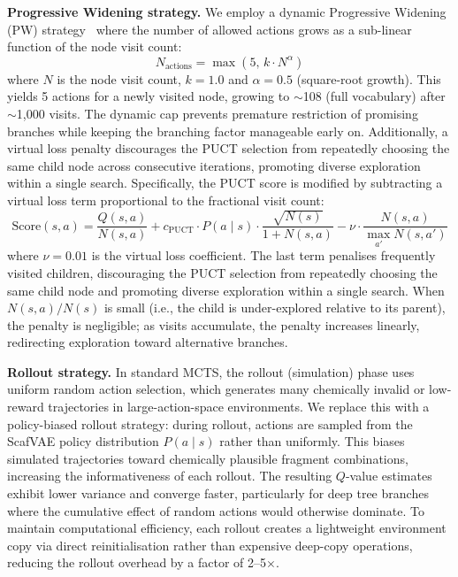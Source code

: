 \documentclass[jcim,article,layout=manuscript]{achemso}
\begin{document}
\textbf{Progressive Widening strategy.} We employ a dynamic Progressive
Widening (PW) strategy~\cite{Coulom2006} where the number of
allowed actions grows as a sub-linear function of the node visit count:
\begin{equation}
  N_{\text{actions}} = \max\left(5,\, k \cdot N^{\alpha}\right)
  \label{eq:pw}
\end{equation}
where $N$ is the node visit count, $k=1.0$ and $\alpha=0.5$
(square-root growth). This yields 5 actions for a newly visited node,
growing to $\sim$108 (full vocabulary) after $\sim$1{,}000 visits. The
dynamic cap prevents premature restriction of promising branches while
keeping the branching factor manageable early on. Additionally, a
virtual loss penalty discourages the PUCT selection from
repeatedly choosing the same child node across consecutive iterations,
promoting diverse exploration within a single search. Specifically, the
PUCT score is modified by subtracting a virtual loss term proportional to
the fractional visit count:
\begin{equation}
  \text{Score}(s,a) = \frac{Q(s,a)}{N(s,a)} +
  c_{\text{PUCT}} \cdot P(a\mid s)
  \cdot \frac{\sqrt{N(s)}}{1 + N(s,a)}
  - \nu \cdot \frac{N(s,a)}{\max_{a'} N(s,a')}
  \label{eq:vl}
\end{equation}
where $\nu=0.01$ is the virtual loss coefficient. The last term penalises
frequently visited children, discouraging the PUCT selection from repeatedly
choosing the same child node and promoting diverse exploration within a
single search. When $N(s,a)/N(s)$ is small (i.e., the child is
under-explored relative to its parent), the penalty is negligible; as
visits accumulate, the penalty increases linearly, redirecting exploration
toward alternative branches.

\textbf{Rollout strategy.} In standard MCTS, the rollout (simulation) phase
uses uniform random action selection, which generates many chemically
invalid or low-reward trajectories in large-action-space environments.
We replace this with a policy-biased rollout strategy: during rollout,
actions are sampled from the ScafVAE policy distribution $P(a\mid s)$
rather than uniformly. This biases simulated trajectories toward chemically
plausible fragment combinations, increasing the informativeness of each
rollout. The resulting $Q$-value estimates exhibit lower variance and
converge faster, particularly for deep tree branches where the cumulative
effect of random actions would otherwise dominate. To maintain computational
efficiency, each rollout creates a lightweight environment copy via direct
reinitialisation rather than expensive deep-copy operations, reducing the
rollout overhead by a factor of 2--5$\times$.
\end{document}
